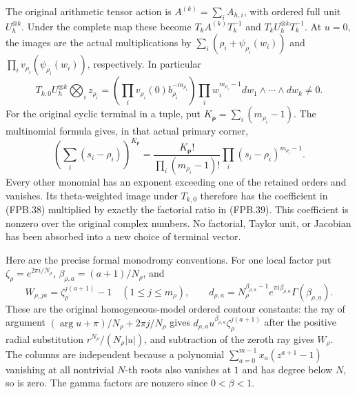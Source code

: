 The original arithmetic tensor action is \(A^{(k)}=\sum_i A_{h,i}\),
with ordered full unit \(U_h^{\otimes k}\). Under the complete map
these become \(T_k A^{(k)}T_k^{-1}\) and
\(T_kU_h^{\otimes k}T_k^{-1}\). At \(u=0\), the images are the
actual multiplications by \(\sum_i(\rho_i+\psi_{\rho_i}(w_i))\)
and \(\prod_i v_{\rho_i}(\psi_{\rho_i}(w_i))\), respectively.
In particular
\[
 T_{k,0}U_h^{\otimes k}\bigotimes_i z_{\rho_i}
   =\left(\prod_i v_{\rho_i}(0)b_{\rho_i}^{-m_{\rho_i}}\right)
        \prod_i w_i^{m_{\rho_i}-1}
                  dw_1\wedge\cdots\wedge dw_k\ne0.
 \tag{FPB.38}\label{GraphV2:eq:fpb-tensor-terminal}
\]
For the original cyclic terminal in a tuple, put
\(K_{\boldsymbol\rho}=\sum_i(m_{\rho_i}-1)\).
The multinomial formula gives, in that actual primary corner,
\[
 \left(\sum_i(s_i-\rho_i)\right)^{K_{\boldsymbol\rho}}
   =\frac{K_{\boldsymbol\rho}!}{\prod_i(m_{\rho_i}-1)!}
                  \prod_i(s_i-\rho_i)^{m_{\rho_i}-1}.
 \tag{FPB.39}\label{GraphV2:eq:fpb-cyclic-terminal}
\]
Every other monomial has an exponent exceeding one of the retained
orders and vanishes. Its theta-weighted image under \(T_{k,0}\)
therefore has the coefficient in (FPB.38) multiplied by exactly the
factorial ratio in (FPB.39). This coefficient is nonzero over the
original complex numbers. No factorial, Taylor unit, or Jacobian has
been absorbed into a new choice of terminal vector.

Here are the precise formal monodromy conventions. For one local
factor put \(\zeta_\rho=e^{2\pi i/N_\rho}\),
\(\beta_{\rho,a}=(a+1)/N_\rho\), and
\[
 W_{\rho,j a}=\zeta_\rho^{j(a+1)}-1\quad(1\le j\le m_\rho),
 \qquad
 d_{\rho,a}=N_\rho^{\beta_{\rho,a}-1}
           e^{\pi i\beta_{\rho,a}}\Gamma(\beta_{\rho,a}).
 \tag{FPB.40}\label{GraphV2:eq:fpb-local-constants}
\]
These are the original homogeneous-model ordered contour constants:
the ray of argument \((\arg u+\pi)/N_\rho+2\pi j/N_\rho\)
gives \(d_{\rho,a}u^{\beta_{\rho,a}}\zeta_\rho^{j(a+1)}\)
after the positive radial substitution \(r^{N_\rho}/(N_\rho|u|)\),
and subtraction of the zeroth ray gives \(W_\rho\). The columns
are independent because a polynomial
\(\sum_{a=0}^{m-1}x_a(z^{a+1}-1)\) vanishing at all nontrivial
\(N\)-th roots also vanishes at \(1\) and has degree below \(N\),
so is zero. The gamma factors are nonzero since \(0<\beta<1\).

